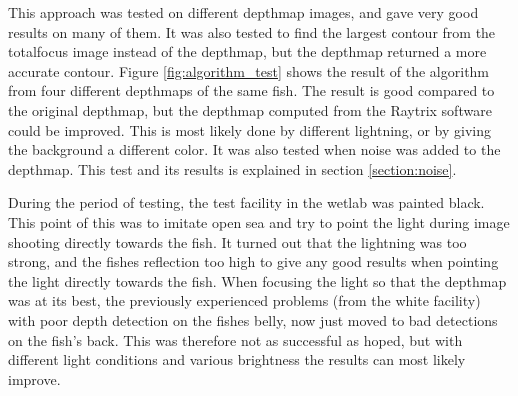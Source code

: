 This approach was tested on different depthmap images, and gave very good results on many of them. It was also tested to find the largest contour from the totalfocus image instead of the depthmap, but the depthmap returned a more accurate contour. Figure \ref{fig:algorithm_test} shows the result of the algorithm from four different depthmaps of the same fish.
The result is good compared to the original depthmap, but the depthmap computed from the Raytrix software could be improved. This is most likely done by different lightning, or by giving the background a different color.
It was also tested when noise was added to the depthmap. This test and its results is explained in section \ref{section:noise}.

During the period of testing, the test facility in the wetlab was painted black. This point of this was to imitate open sea and try to point the light during image shooting directly towards the fish. It turned out that the lightning was too strong, and the fishes reflection too high to give any good results when pointing the light directly towards the fish. When focusing the light so that the depthmap was at its best, the previously experienced problems (from the white facility) with poor depth detection on the fishes belly, now just moved to bad detections on the fish's back.
This was therefore not as successful as hoped, but with different light conditions and various brightness the results can most likely improve.


